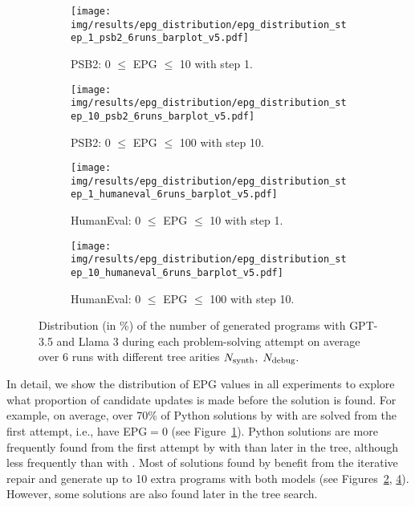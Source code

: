 \begin{figure}[tb]
\vspace{-2.2ex}
\begin{subfigure}{.8\columnwidth}
\centering
\texttt{[image: img/results/epg\_distribution/epg\_distribution\_step\_1\_psb2\_6runs\_barplot\_v5.pdf]}
  \caption{PSB2: 0 $\leq$ EPG $\leq$ 10 with step 1.}
  \label{fig:psb2-epg-distrib-step-1}
\end{subfigure}
% 
% 
\begin{subfigure}{.8\columnwidth}
\centering
\texttt{[image: img/results/epg\_distribution/epg\_distribution\_step\_10\_psb2\_6runs\_barplot\_v5.pdf]}
  \caption{PSB2: 0 $\leq$ EPG $\leq$ 100 with step 10.}
  \label{fig:psb2-epg-distrib-step-10}
\end{subfigure}
% 
\begin{subfigure}{.8\columnwidth}
\centering
\texttt{[image: img/results/epg\_distribution/epg\_distribution\_step\_1\_humaneval\_6runs\_barplot\_v5.pdf]}
  \caption{HumanEval: 0 $\leq$ EPG $\leq$ 10 with step 1.}
  \label{fig:humaneval-epg-distrib-step-1}
\end{subfigure}
% 
\begin{subfigure}{.8\columnwidth}
\centering
\texttt{[image: img/results/epg\_distribution/epg\_distribution\_step\_10\_humaneval\_6runs\_barplot\_v5.pdf]}
  \caption{HumanEval: 0 $\leq$ EPG $\leq$ 100 with step 10.}
  \label{fig:humaneval-epg-distrib-step-10}
\end{subfigure}
\vspace{-10pt}
\caption{Distribution (in \%) of the number of generated programs with GPT-3.5 and Llama 3 during each problem-solving attempt on average over 6 runs with different tree arities $N_\text{synth}{}, \; N_\text{debug}{}.$}
\label{fig:epg-distribution}
\vspace{-3ex}
\end{figure}



In detail, we show the distribution of EPG values in all experiments to explore what proportion of candidate updates is made before the solution is found.
For example, on average, over 70\% of Python solutions by \method{} with \gpt{} are solved from the first attempt, i.e., have EPG$=0$ (see Figure~\ref{fig:psb2-epg-distrib-step-1}).
Python solutions are more frequently found from the first attempt by \method{} with \llama{} than later in the tree, although less frequently than with \gpt{}.
Most of solutions found by \method{} benefit from the iterative repair and generate up to 10 extra programs with both models (see Figures~\ref{fig:psb2-epg-distrib-step-10}, \ref{fig:humaneval-epg-distrib-step-10}). 
However, some solutions are also found later in the tree search. 

